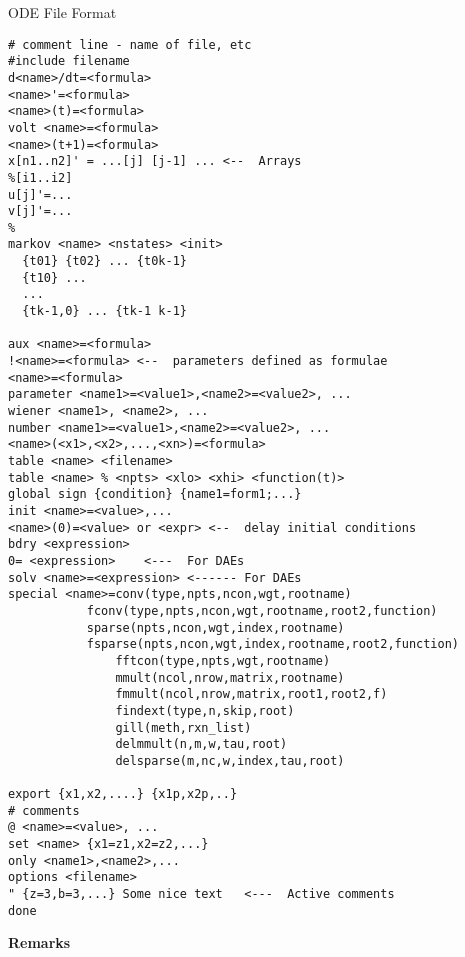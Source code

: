 \begin{center} {\large ODE File Format}\end{center}
\begin{verbatim}
# comment line - name of file, etc
#include filename   
d<name>/dt=<formula>
<name>'=<formula>
<name>(t)=<formula>
volt <name>=<formula>
<name>(t+1)=<formula>
x[n1..n2]' = ...[j] [j-1] ... <--  Arrays
%[i1..i2]
u[j]'=...
v[j]'=...
% 
markov <name> <nstates> <init>
  {t01} {t02} ... {t0k-1}
  {t10} ...
  ...
  {tk-1,0} ... {tk-1 k-1}

aux <name>=<formula>
!<name>=<formula> <--  parameters defined as formulae
<name>=<formula>
parameter <name1>=<value1>,<name2>=<value2>, ...
wiener <name1>, <name2>, ...
number <name1>=<value1>,<name2>=<value2>, ...
<name>(<x1>,<x2>,...,<xn>)=<formula>
table <name> <filename>
table <name> % <npts> <xlo> <xhi> <function(t)>
global sign {condition} {name1=form1;...}
init <name>=<value>,...
<name>(0)=<value> or <expr> <--  delay initial conditions
bdry <expression>
0= <expression>    <---  For DAEs
solv <name>=<expression> <------ For DAEs
special <name>=conv(type,npts,ncon,wgt,rootname)
	       fconv(type,npts,ncon,wgt,rootname,root2,function)
	       sparse(npts,ncon,wgt,index,rootname)
	       fsparse(npts,ncon,wgt,index,rootname,root2,function)
               fftcon(type,npts,wgt,rootname)
               mmult(ncol,nrow,matrix,rootname)
               fmmult(ncol,nrow,matrix,root1,root2,f)
               findext(type,n,skip,root)
               gill(meth,rxn_list)
               delmmult(n,m,w,tau,root)
               delsparse(m,nc,w,index,tau,root)
          
export {x1,x2,....} {x1p,x2p,..}     
# comments
@ <name>=<value>, ...
set <name> {x1=z1,x2=z2,...}
only <name1>,<name2>,...
options <filename>
" {z=3,b=3,...} Some nice text   <---  Active comments 
done
\end{verbatim}
{\bf Remarks}
